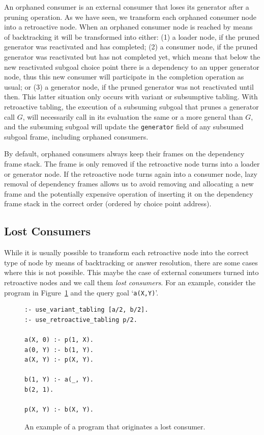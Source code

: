 An orphaned consumer is an external consumer that loses its generator after a pruning operation.
As we have seen, we transform each orphaned consumer node into a retroactive node.
When an orphaned consumer node is reached by means of backtracking it will be transformed into either:
(1) a loader node, if the pruned generator was reactivated and has completed; (2) a consumer node,
if the pruned generator was reactivated but has not completed yet, which means that below the new
reactivated subgoal choice point there is a dependency to an upper generator node, thus this new
consumer will participate in the completion operation as usual; or (3) a generator node,
if the pruned generator was not reactivated until then. This latter situation only occurs with
variant or subsumptive tabling. With retroactive tabling, the execution of a subsuming subgoal
that prunes a generator call $G$, will necessarily call in its evaluation the same or a more general
than $G$, and the subsuming subgoal will update the \texttt{generator} field
of any subsumed subgoal frame, including orphaned consumers.

By default, orphaned consumers always keep their frames on the dependency frame stack. The frame is only
removed if the retroactive node turns into a loader or generator node. If the retroactive node turns again
into a consumer node, lazy removal of dependency frames allows us to avoid removing and allocating a new
frame and the potentially expensive operation of inserting it on the dependency frame stack in the
correct order (ordered by choice point address).

\subsection{Lost Consumers}

While it is usually possible to transform each retroactive node into the correct type of node by means
of backtracking or answer resolution, there are some cases where this is not possible. This maybe the case of
external consumers turned into retroactive nodes and we call them \textit{lost consumers}.
For an example, consider the program in Figure~\ref{fig:retro_lost_consumer_code} and the query goal
`\texttt{a(X,Y)}'.

\begin{figure}[ht]
\begin{Verbatim}
:- use_variant_tabling [a/2, b/2].
:- use_retroactive_tabling p/2.

a(X, 0) :- p(1, X).
a(0, Y) :- b(1, Y).
a(X, Y) :- p(X, Y).

b(1, Y) :- a(_, Y).
b(2, 1).

p(X, Y) :- b(X, Y).
\end{Verbatim}
\caption{An example of a program that originates a lost consumer.}
\label{fig:retro_lost_consumer_code}
\end{figure}

